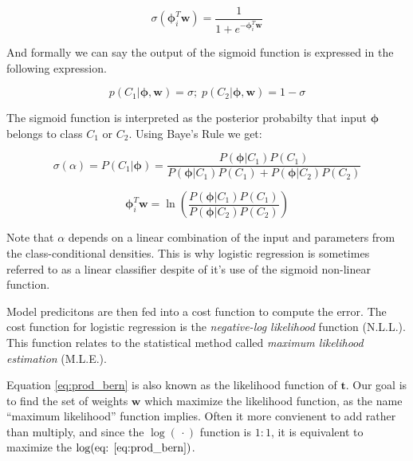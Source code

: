\documentclass[11pt]{article}
\begin{document}
\begin{equation}\label{eq:sigmoid}
  \sigma\left(\mathbf{\phi}_{i}^{T}\mathbf{w}\right) = \frac{1}{1+e^{-\mathbf{\phi}_{i}^{T}\mathbf{w}}}
\end{equation}

And formally we can say the output of the sigmoid function is expressed in the following expression.

\begin{equation}
p\left(C_{1}|\mathbf{\phi},\mathbf{w}\right) = \sigma;\; p\left(C_{2}|\mathbf{\phi},\mathbf{w}\right) = 1 - \sigma
\end{equation}

The sigmoid function is interpreted as the posterior probabilty that input $\mathbf{\phi}$ belongs to class $C_{1}$ or $C_{2}$. Using Baye's Rule we get:

\begin{equation}
   \sigma\left(\alpha\right) = P\left(C_{1}|\mathbf{\phi}\right) = \frac{P\left(\mathbf{\phi}|C_{1}\right)P\left(C_{1}\right)}{P\left(\mathbf{\phi}|C_{1}\right)P\left(C_{1}\right) + P\left(\mathbf{\phi}|C_{2}\right)P\left(C_{2}\right)}
\end{equation}

\begin{equation}
  \mathbf{\phi}_{i}^{T}\mathbf{w} = \ln\left(\frac{P\left(\mathbf{\phi}|C_{1}\right)P\left(C_{1}\right)}{P\left(\mathbf{\phi}|C_{2}\right)P\left(C_{2}\right)}\right)
\end{equation}


Note that $\alpha$ depends on a linear combination of the input and parameters from the class-conditional densities. This is why logistic regression is sometimes referred to as a linear classifier despite of it's use of the sigmoid non-linear function. 

Model predicitons are then fed into a cost function to compute the error. The cost function for logistic regression is the \emph{negative-log likelihood} function (N.L.L.). This function relates to the statistical method called \emph{maximum likelihood estimation} (M.L.E.).

Equation \ref{eq:prod_bern} is also known as the likelihood function of $\mathbf{t}$. Our goal is to find the set of weights $\mathbf{w}$ which maximize the likelihood function, as the name ``maximum likelihood'' function implies. Often it more convienent to add rather than multiply, and since the $\log\left(\,\cdotp\right)$ function is $1:1$, it is equivalent to maximize the $\log(\text{eq: }\ref{eq:prod_bern})$.
\end{document}
